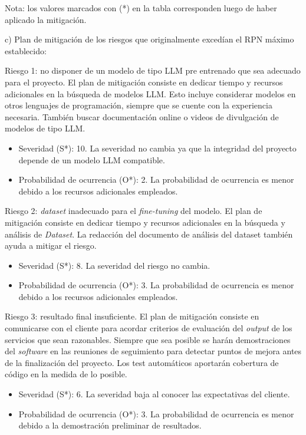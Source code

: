 \documentclass[
11pt, %
]{Clases/charter}
\begin{document}
Nota: los valores marcados con (*) en la tabla corresponden luego de haber aplicado la mitigación.

c) Plan de mitigación de los riesgos que originalmente excedían el RPN máximo establecido:

Riesgo 1: no disponer de un modelo de tipo LLM pre entrenado que sea adecuado para el proyecto.
El plan de mitigación consiste en dedicar tiempo y recursos adicionales en la búsqueda de modelos LLM.
Esto incluye considerar modelos en otros lenguajes de programación, siempre que se cuente con la experiencia necesaria.
También buscar documentación online o videos de divulgación de modelos de tipo LLM.
\begin{itemize}
	\item  Severidad (S*): 10. La severidad no cambia ya que la integridad del proyecto depende de un modelo LLM compatible.
	\item  Probabilidad de ocurrencia (O*): 2. La probabilidad de ocurrencia es menor debido a los recursos adicionales empleados.
\end{itemize}

Riesgo 2: \textit{dataset} inadecuado para el \textit{fine-tuning} del modelo.
El plan de mitigación consiste en dedicar tiempo y recursos adicionales en la búsqueda y análisis de \textit{Dataset}.
La redacción del documento de análisis del dataset también ayuda a mitigar el riesgo.
\begin{itemize}
	\item  Severidad (S*): 8. La severidad del riesgo no cambia.
	\item  Probabilidad de ocurrencia (O*): 3. La probabilidad de ocurrencia es menor debido a los recursos adicionales empleados.
\end{itemize}

Riesgo 3: resultado final insuficiente.
El plan de mitigación consiste en comunicarse con el cliente para acordar criterios de evaluación del \textit{output} de los servicios que sean razonables.
Siempre que sea posible se harán demostraciones del \textit{software} en las reuniones de seguimiento para detectar puntos de mejora antes de la finalización del proyecto.
Los test automáticos aportarán cobertura de código en la medida de lo posible.

\begin{itemize}
	\item  Severidad (S*): 6. La severidad baja al conocer las expectativas del cliente.
	\item  Probabilidad de ocurrencia (O*): 3. La probabilidad de ocurrencia es menor debido a la demostración preliminar de resultados.
\end{itemize}
\end{document}
